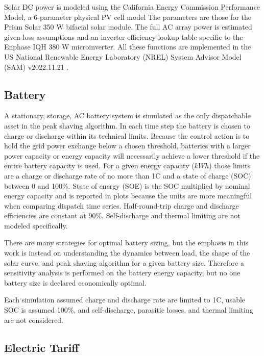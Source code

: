 \documentclass[journal,article,submit,pdftex,moreauthors]{Definitions/mdpi}
\begin{document}
Solar DC power is modeled using the California Energy Commission Performance Model, a 6-parameter physical PV cell model The parameters are those for the Prism Solar 350 W bifacial solar module. The full AC array power is estimated given loss assumptions and an inverter efficiency lookup table specific to the Enphase IQH 380 W microinverter. All these functions are implemented in the US National Renewable Energy Laboratory (NREL) System Advisor Model (SAM) v2022.11.21 \cite{NREL2022}.

\subsection{Battery}\label{battery}%

A stationary, storage, AC battery system is simulated as the only dispatchable asset in the peak shaving algorithm. In each time step the battery is chosen to charge or discharge within its technical limits. Because the control action is to hold the grid power exchange below a chosen threshold, batteries with a larger power capacity or energy capacity will necessarily achieve a lower threshold if the entire battery capacity is used. For a given energy capacity (\(kWh\)) those limits are a charge or discharge rate of no more than 1C and a state of charge (SOC) between 0 and 100\%. State of energy (SOE) is the SOC multiplied by nominal energy capacity and is reported in plots because the units are more meaningful when comparing dispatch time series. Half-round-trip charge and discharge efficiencies are constant at 90\%. Self-discharge and thermal limiting are not modeled specifically.

There are many strategies for optimal battery sizing, but the emphasis in this work is instead on understanding the dynamics between load, the shape of the solar curve, and peak shaving algorithm for a given battery size. Therefore a sensitivity analysis is performed on the battery energy capacity, but no one battery size is declared economically optimal.

Each simulation assumed charge and discharge rate are limited to 1C, usable SOC is assumed 100\%, and self-discharge, parasitic losses, and thermal limiting are not considered.

\subsection{Electric Tariff}\label{electric-tariff}
\end{document}
